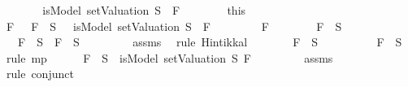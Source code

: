 \begin{isabellebody}
\ \ \ \ \isamarkupfalse%
\ \isamarkupfalse%
\ {\isachardoublequoteopen}isModel\ {\isacharparenleft}setValuation\ S{\isacharparenright}\ {\isacharparenleft}\isactrlbold {\isasymnot}\ F{\isacharparenright}{\isachardoublequoteclose}\isanewline
\ \ \ \ \ \ \isamarkupfalse%
\ this\isanewline
\ \ \isamarkupfalse%
\isanewline
{}\isamarkupfalse%
\isanewline
\ \ \isamarkupfalse%
\ {\isachardoublequoteopen}{\isasymAnd}F{\isachardot}\ \isactrlbold {\isasymnot}\ {\isacharparenleft}\isactrlbold {\isasymnot}\ F{\isacharparenright}\ {\isasymin}\ S\ {\isasymlongrightarrow}\ {\isasymnot}\ isModel\ {\isacharparenleft}setValuation\ S{\isacharparenright}\ {\isacharparenleft}\isactrlbold {\isasymnot}\ F{\isacharparenright}{\isachardoublequoteclose}\isanewline
\ \ \isamarkupfalse%
\isanewline
\ \ \ \ \isamarkupfalse%
\ F\isanewline
\ \ \ \ \isamarkupfalse%
\ {\isachardoublequoteopen}\isactrlbold {\isasymnot}\ {\isacharparenleft}\isactrlbold {\isasymnot}\ F{\isacharparenright}\ {\isasymin}\ S{\isachardoublequoteclose}\isanewline
\ \ \ \ \isamarkupfalse%
\ {\isachardoublequoteopen}\isactrlbold {\isasymnot}\ {\isacharparenleft}\isactrlbold {\isasymnot}\ F{\isacharparenright}\ {\isasymin}\ S\ {\isasymlongrightarrow}\ F\ {\isasymin}\ S{\isachardoublequoteclose}\ \isanewline
\ \ \ \ \ \ \isamarkupfalse%
\ assms{\isacharparenleft}{}{\isacharparenright}\ \isamarkupfalse%
\ {\isacharparenleft}rule\ Hintikka{\isacharunderscore}l{}{\isacharparenright}\isanewline
\ \ \ \ \isamarkupfalse%
\ \isamarkupfalse%
\ {\isachardoublequoteopen}F\ {\isasymin}\ S{\isachardoublequoteclose}\isanewline
\ \ \ \ \ \ \isamarkupfalse%
\ {\isacartoucheopen}\isactrlbold {\isasymnot}\ {\isacharparenleft}\isactrlbold {\isasymnot}\ F{\isacharparenright}\ {\isasymin}\ S{\isacartoucheclose}\ \isamarkupfalse%
\ {\isacharparenleft}rule\ mp{\isacharparenright}\isanewline
\ \ \ \ \isamarkupfalse%
\ {\isachardoublequoteopen}F\ {\isasymin}\ S\ {\isasymlongrightarrow}\ isModel\ {\isacharparenleft}setValuation\ S{\isacharparenright}\ F{\isachardoublequoteclose}\ \isanewline
\ \ \ \ \ \ \isamarkupfalse%
\ assms{\isacharparenleft}{}{\isacharparenright}\ \isamarkupfalse%
\ {\isacharparenleft}rule\ conjunct{}{\isacharparenright}\isanewline
\ \ \ \ \isamarkupfalse%

\end{isabellebody}
